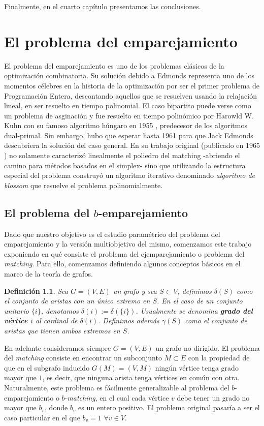 \documentclass[twoside,a4paper,openright,12pt]{book}
\newtheorem{defi}{Definici\'on}[section]
\begin{document}
Finalmente, en el cuarto capítulo presentamos las conclusiones.
\newpage
\thispagestyle{empty}
\chapter{El problema del emparejamiento}
El problema del emparejamiento es uno de los problemas clásicos de la optimización combinatoria. Su solución debido a Edmonds representa uno de los momentos célebres en la historia de la optimización por ser el primer problema de Programación Entera, descontando aquellos que se resuelven usando la relajación lineal, en ser resuelto en tiempo polinomial. El caso bipartito puede verse como un problema de asginación y fue resuelto en tiempo polinómico por Harowld W. Kuhn con su famoso algoritmo húngaro en 1955 \cite{kuhn}, predecesor de los algoritmos dual-primal. Sin embargo, hubo que esperar hasta 1961 para que Jack Edmonds descubriera la solución del caso general. En su trabajo original (publicado en 1965 \cite{edmond}) no solamente caracterizó linealmente el poliedro del matching -abriendo el camino para métodos basados en el simplex- sino que utilizando la estructura especial del problema construyó un algoritmo iterativo denominado \textit{algoritmo de blossom} que resuelve el problema polinomialmente.

\section{El problema del $b$-emparejamiento}
Dado que nuestro objetivo es el estudio paramétrico del problema del emparejamiento y la versión multiobjetivo del mismo, comenzamos este trabajo exponiendo en qué consiste el problema del ejemparejamiento o problema del \textit{matching}. Para ello, comenzamos definiendo algunos conceptos básicos en el marco de la teoría de grafos.
\begin{defi}
Sea $G=(V,E)$ un grafo y sea $S \subset V$, definimos $\delta(S)$ como el conjunto de aristas con un único extremo en $S$. En el caso de un conjunto unitario $\{i\}$, denotamos $\delta(i):=\delta(\{i\})$. Usualmente se denomina \textbf{grado del vértice $i$} al cardinal de $\delta(i)$. Definimos además $\gamma(S)$ como el conjunto de aristas que tienen ambos extremos en $S$.
\end{defi}

En adelante consideramos siempre $G=(V,E)$ un grafo no dirigido. El problema del \textit{matching} consiste en encontrar un subconjunto $M\subset E$ con la propiedad de que en el subgrafo inducido $G(M)=(V,M)$ ningún vértice tenga grado mayor que $1$, es decir, que ninguna arista tenga vértices en común con otra. Naturalmente, este problema es fácilmente generalizable al problema del $b$-emparejamiento o $b$-\textit{matching}, en el cual cada vértice $v$ debe tener un grado no mayor que $b_v$, donde $b_v$ es un entero positivo. El problema original pasaría a ser el caso particular en el que $b_v = 1$ $\forall v \in V$.
\end{document}
